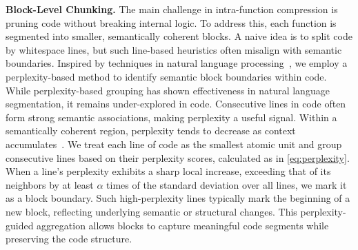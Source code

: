 \documentclass[10pt,conference]{IEEEtran}
\newcommand{\todoc}[2]{{\textcolor{#1}{\textbf{[#2]}}}}
\newcommand{\shi}[1]{\todoc{orange}{Shi: #1}}
\begin{document}
\noindent\textbf{Block-Level Chunking.}
The main challenge in intra-function compression is pruning code without breaking internal logic. To address this, each function is segmented into smaller, semantically coherent blocks.
A naive idea is to split code by whitespace lines, but such line-based heuristics often misalign with semantic boundaries. Inspired by techniques in natural language processing~\cite{zhao2024meta}, we employ a perplexity-based method to identify semantic block boundaries within code. While perplexity-based grouping has shown effectiveness in natural language segmentation, it remains under-explored in code. Consecutive lines in code often form strong semantic associations, making perplexity a useful signal. 
Within a semantically coherent region, perplexity tends to decrease as context accumulates~\cite{zhao2024meta}. We treat each line of code as the smallest atomic unit and group consecutive lines based on their perplexity scores, calculated as in \eqref{eq:perplexity}. 
When a line's perplexity exhibits a sharp local increase, exceeding that of its neighbors by at least $\alpha$ times of the standard deviation over all lines, we mark it as a block boundary. Such high-perplexity lines typically mark the beginning of a new block, reflecting underlying semantic or structural changes. This perplexity-guided aggregation allows blocks to capture meaningful code segments while preserving the code structure.

\end{document}
